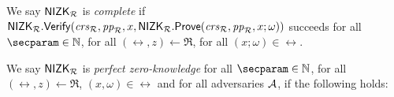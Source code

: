 \begin{definition}\label{def:nizk_completeness}
	We say ${\mathsf{NIZK}}_{\mathcal{R}}$ is {\em complete} if \ ${\mathsf{NIZK}}_{\mathcal{R}}.{\mathsf{Verify}}(\mathit{crs}_{\mathcal{R}},  \mathit{pp}_{\mathcal{R}}, x, {\mathsf{NIZK}}_{\mathcal{R}}.{\mathsf{Prove}}(\mathit{crs}_{\mathcal{R}}, \mathit{pp}_{\mathcal{R}}, x; \omega))$ succeeds for all 
	$ \secparam \in \mathbb{N} $, for all $ (\rel,z) \leftarrow \mathfrak{R} $, for all $(x; \omega) \in \rel$.  %
\end{definition}

\def\advV{\ensuremath{V^*}\xspace} %

\begin{definition}\label{def:nizk_zero_knowledge}
	We say ${\mathsf{NIZK}}_{\mathcal{R}}$ is {\em perfect zero-knowledge} for all $ \secparam \in \mathbb{N} $, for all $ (\rel,z) \leftarrow \mathfrak{R} $, $ (x,\omega) \in \rel $ and for all adversaries $ \mathcal{A} $, if the following holds:
	\allowbreak
	\doublecolumn{\begin{align*}
		\Pr[& \adv(\crs_\rel,  \pp_\rel, z, \pi,\rel) = 1 \ | \ (\crs_\rel, \tau_\rel,  \pp_\rel) \leftarrow \NIZK_\rel.\Setup (1^{\lambda}),  \\\nonumber
		& \pi \leftarrow \NIZK_\rel.\Prove (\crs_\rel, \pp_\rel, x;\omega)]\\
		=\Pr[& \adv(\crs_\rel,  \pp_\rel, z, \pi,\rel) = 1 \ | \ (\crs_\rel, \tau,  \pp_\rel) \leftarrow \NIZK_\rel.\Setup (1^{\lambda}), \\\nonumber
		&  \pi \leftarrow \NIZK_\rel.\Simulate (\tau_\rel,  \pp_\rel, x)]
	\end{align*}
}{\begin{align*}
	\Pr[& \adv(\crs_\rel, \pp_\rel, z, \pi,\rel) = 1 \ | \ (\crs_\rel, \tau_\rel, \pp_\rel) \leftarrow \NIZK_\rel.\Setup (1^{\lambda}),   \pi \leftarrow \NIZK_\rel.\Prove (\crs_\rel,  \pp_\rel, x; \omega)]\\
	=\Pr[& \adv(\crs_\rel,  \pp_\rel, z, \pi,\rel) = 1 \ | \ (\crs_\rel, \tau_\rel, \pp_\rel) \leftarrow \NIZK_\rel.\Setup (1^{\lambda}),   \pi \leftarrow \NIZK_\rel.\Simulate (\tau_\rel,  \pp_\rel, x)]
\end{align*}}
	
\end{definition}

\def\advP{\ensuremath{P^*}\xspace} %

